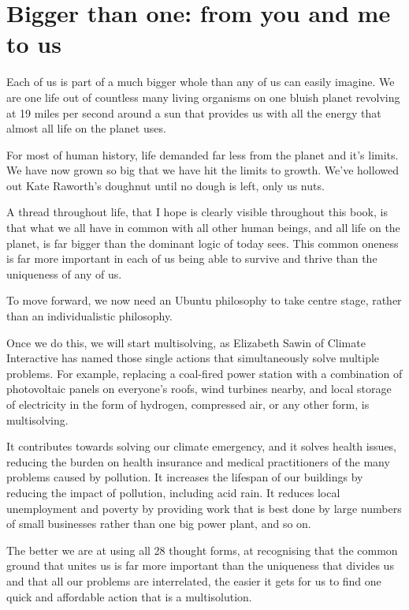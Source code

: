 \section{Bigger than one: from you and me to us}
Each of us is part of a much bigger whole than any of us can easily imagine. We are one life out of countless many living organisms on one bluish planet revolving at 19 miles per second around a sun that provides us with all the energy that almost all life on the planet uses.


For most of human history, life demanded far less from the planet and it’s limits. We have now grown so big that we have hit the limits to growth\cite{rome-limits}. We've hollowed out Kate Raworth's doughnut\cite{raworth-doughnut} until no dough is left, only us nuts.


A thread throughout life, that I hope is clearly visible throughout this book, is that what we all have in common with all other human beings, and all life on the planet, is far bigger than the dominant logic of today sees. This common oneness is far more important in each of us being able to survive and thrive than the uniqueness of any of us.


To move forward, we now need an Ubuntu philosophy to take centre stage, rather than an individualistic philosophy.


Once we do this, we will start multisolving\cite{sawin-multisolving}, as Elizabeth Sawin of Climate Interactive has named those single actions that simultaneously solve multiple problems. For example, replacing a coal-fired power station with a combination of photovoltaic panels on everyone's roofs, wind turbines nearby, and local storage of electricity in the form of hydrogen, compressed air, or any other form, is multisolving.


It contributes towards solving our climate emergency, and it solves health issues, reducing the burden on health insurance and medical practitioners of the many problems caused by pollution. It increases the lifespan of our buildings by reducing the impact of pollution, including acid rain. It reduces local unemployment and poverty by providing work that is best done by large numbers of small businesses rather than one big power plant, and so on.


The better we are at using all 28 thought forms,  at recognising that the common ground that unites us is far more important than the uniqueness that divides us and that all our problems are interrelated, the easier it gets for us to find one quick and affordable action that is a multisolution.


